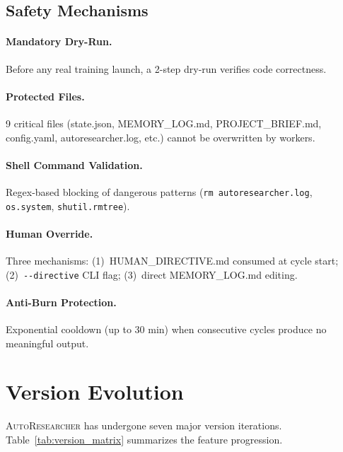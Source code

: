 \documentclass[11pt,a4paper]{article}
\newcommand{\sysname}{\textsc{AutoResearcher}}
\newcommand{\toolname}[1]{\texttt{#1}}
\begin{document}
\subsection{Safety Mechanisms}

\paragraph{Mandatory Dry-Run.}
Before any real training launch, a 2-step dry-run verifies code correctness.

\paragraph{Protected Files.}
9 critical files (state.json, MEMORY\_LOG.md, PROJECT\_BRIEF.md, config.yaml, autoresearcher.log, etc.) cannot be overwritten by workers.

\paragraph{Shell Command Validation.}
Regex-based blocking of dangerous patterns (\toolname{rm autoresearcher.log}, \toolname{os.system}, \toolname{shutil.rmtree}).

\paragraph{Human Override.}
Three mechanisms: (1)~HUMAN\_DIRECTIVE.md consumed at cycle start; (2)~\toolname{-{}-directive} CLI flag; (3)~direct MEMORY\_LOG.md editing.

\paragraph{Anti-Burn Protection.}
Exponential cooldown (up to 30 min) when consecutive cycles produce no meaningful output.


\section{Version Evolution}

\sysname{} has undergone seven major version iterations. Table~\ref{tab:version_matrix} summarizes the feature progression.
\end{document}
